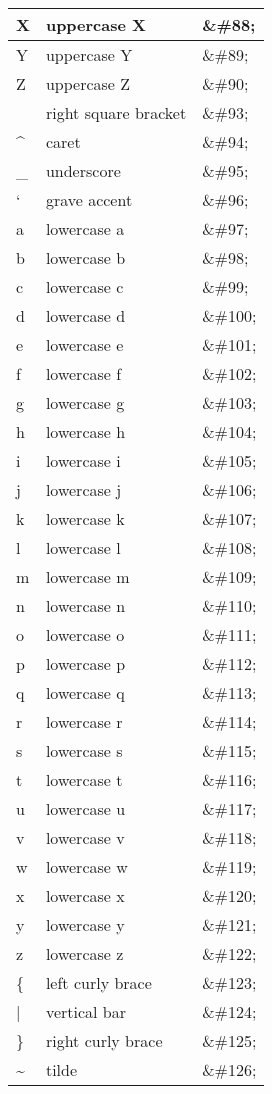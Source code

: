 \begin{longtable}{|l|l|l|}
\hline
X	&uppercase X			&\&\#88;\\
\hline
Y	&uppercase Y			&\&\#89;\\
\hline
Z	&uppercase Z			&\&\#90;\\
\hline
[	&left square bracket	&\&\#91;\\
\hline
\	&backslash			&\&\#92;\\
\hline
]	&right square bracket	&\&\#93;\\
\hline
\^{}	&caret				&\&\#94;\\
\hline
\_	&underscore			&\&\#95;\\
\hline
`	&grave accent			&\&\#96;\\
\hline
a	&lowercase a			&\&\#97;\\
\hline
b	&lowercase b			&\&\#98;\\
\hline
c	&lowercase c			&\&\#99;\\
\hline
d	&lowercase d			&\&\#100;\\
\hline
e	&lowercase e			&\&\#101;\\
\hline
f	&lowercase f			&\&\#102;\\
\hline
g	&lowercase g			&\&\#103;\\
\hline
h	&lowercase h			&\&\#104;\\
\hline
i	&lowercase i			&\&\#105;\\
\hline
j	&lowercase j			&\&\#106;\\
\hline
k	&lowercase k			&\&\#107;\\
\hline
l	&lowercase l			&\&\#108;\\
\hline
m	&lowercase m			&\&\#109;\\
\hline
n	&lowercase n			&\&\#110;\\
\hline
o	&lowercase o			&\&\#111;\\
\hline
p	&lowercase p			&\&\#112;\\
\hline
q	&lowercase q			&\&\#113;\\
\hline
r	&lowercase r			&\&\#114;\\
\hline
s	&lowercase s			&\&\#115;\\
\hline
t	&lowercase t			&\&\#116;\\
\hline
u	&lowercase u			&\&\#117;\\
\hline
v	&lowercase v			&\&\#118;\\
\hline
w	&lowercase w			&\&\#119;\\
\hline
x	&lowercase x			&\&\#120;\\
\hline
y	&lowercase y			&\&\#121;\\
\hline
z	&lowercase z			&\&\#122;\\
\hline
\{	&left curly brace		&\&\#123;\\
\hline
|	&vertical bar			&\&\#124;\\
\hline
\}	&right curly brace		&\&\#125;\\
\hline
\~{}	&tilde				&\&\#126;\\
\hline
\end{longtable}

